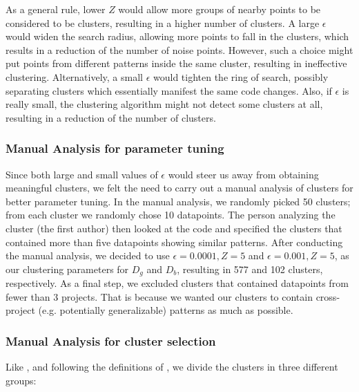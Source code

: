As a general rule, lower $Z$ would allow more groups of nearby points to be considered to be clusters, resulting in a higher number of clusters. A large $\epsilon$ would widen the search radius, allowing more points to fall in the clusters, which results in a reduction of the number of noise points. However, such a choice might put points from different patterns inside the same cluster, resulting in ineffective clustering. Alternatively, a small $\epsilon$ would tighten the ring of search, possibly separating clusters which essentially manifest the same code changes. Also, if $\epsilon$ is really small, the clustering algorithm might not detect some clusters at all, resulting in a reduction of the number of clusters. 

\subsubsection{\label{sec:manual_analysis_parameter_tuning}Manual Analysis for parameter tuning}

Since both large and small values of $\epsilon$ would steer us away from obtaining meaningful clusters, we felt the need to carry out a manual analysis of clusters for better parameter tuning. In the manual analysis, we randomly picked 50 clusters; from each cluster we randomly chose 10 datapoints. The person analyzing the cluster (the first author) then looked at the code and specified the clusters that contained more than five datapoints showing similar patterns. After conducting the manual analysis, we decided to use $\epsilon=0.0001, Z=5$ and $\epsilon=0.001, Z=5$, as our clustering parameters for $D_g$ and $D_b$, resulting in 577 and 102 clusters, respectively. As a final step, we excluded clusters that contained datapoints from fewer than 3 projects. That is because we wanted our clusters to contain cross-project (e.g. potentially generalizable) patterns as much as possible.  

\subsubsection{\label{sec:manual_analysis_cluster_selection}Manual Analysis for cluster selection}

Like \cite{yang2022mining}, and following the definitions of \cite{cotroneo2019analyzing}, we divide the clusters in three different groups:

